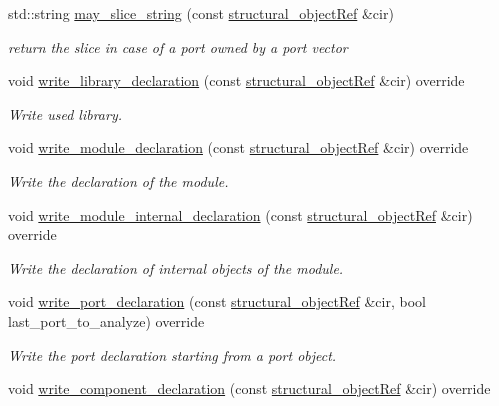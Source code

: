 \begin{DoxyCompactItemize}
std\+::string \hyperlink{structVHDL__writer_a8fe8a416efdb306d8f290e0a4b7faef8}{may\+\_\+slice\+\_\+string} (const \hyperlink{structural__objects_8hpp_a8ea5f8cc50ab8f4c31e2751074ff60b2}{structural\+\_\+object\+Ref} \&cir)
\begin{DoxyCompactList}\small\item\em return the slice in case of a port owned by a port vector \end{DoxyCompactList}\item 
void \hyperlink{structVHDL__writer_ab617f377af475bddff6b07f327f8b058}{write\+\_\+library\+\_\+declaration} (const \hyperlink{structural__objects_8hpp_a8ea5f8cc50ab8f4c31e2751074ff60b2}{structural\+\_\+object\+Ref} \&cir) override
\begin{DoxyCompactList}\small\item\em Write used library. \end{DoxyCompactList}\item 
void \hyperlink{structVHDL__writer_a9387c719414e8fb4e8b086ce9d9bc500}{write\+\_\+module\+\_\+declaration} (const \hyperlink{structural__objects_8hpp_a8ea5f8cc50ab8f4c31e2751074ff60b2}{structural\+\_\+object\+Ref} \&cir) override
\begin{DoxyCompactList}\small\item\em Write the declaration of the module. \end{DoxyCompactList}\item 
void \hyperlink{structVHDL__writer_a30331328811ba735b896a60304e09074}{write\+\_\+module\+\_\+internal\+\_\+declaration} (const \hyperlink{structural__objects_8hpp_a8ea5f8cc50ab8f4c31e2751074ff60b2}{structural\+\_\+object\+Ref} \&cir) override
\begin{DoxyCompactList}\small\item\em Write the declaration of internal objects of the module. \end{DoxyCompactList}\item 
void \hyperlink{structVHDL__writer_a2d88694c56cecd9e97117da37c3cf0d3}{write\+\_\+port\+\_\+declaration} (const \hyperlink{structural__objects_8hpp_a8ea5f8cc50ab8f4c31e2751074ff60b2}{structural\+\_\+object\+Ref} \&cir, bool last\+\_\+port\+\_\+to\+\_\+analyze) override
\begin{DoxyCompactList}\small\item\em Write the port declaration starting from a port object. \end{DoxyCompactList}\item 
void \hyperlink{structVHDL__writer_a34dbb60f7e32cdaab7b617f5cb5d9943}{write\+\_\+component\+\_\+declaration} (const \hyperlink{structural__objects_8hpp_a8ea5f8cc50ab8f4c31e2751074ff60b2}{structural\+\_\+object\+Ref} \&cir) override

\end{DoxyCompactItemize}
